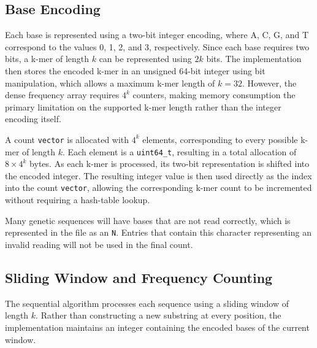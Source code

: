 \documentclass{article}
\begin{document}
\vspace{\baselineskip}

\subsection{Base Encoding}

\vspace{\baselineskip}

Each base is represented using a two-bit integer encoding, where A, C, G, and T correspond to the values
0, 1, 2, and 3, respectively. Since each base requires two bits, a k-mer of length $k$ can be represented
using $2k$ bits. The implementation then stores the encoded k-mer in an unsigned 64-bit integer using bit manipulation, 
which allows a maximum k-mer length of $k=32$. However, the dense frequency array requires $4^k$ counters, making memory 
consumption the primary limitation on the supported k-mer length rather than the integer encoding itself.

\vspace{\baselineskip}

A count \texttt{vector} is allocated with $4^k$ elements, corresponding to every possible k-mer of length $k$.
Each element is a \texttt{uint64\_t}, resulting in a total allocation of $8 \times 4^k$ bytes. As each
k-mer is processed, its two-bit representation is shifted into the encoded integer. The resulting integer
value is then used directly as the index into the count \texttt{vector}, allowing the corresponding k-mer count
to be incremented without requiring a hash-table lookup.

\vspace{\baselineskip}

Many genetic sequences will have bases that are not read correctly, which is represented in the file as an \texttt{N}. 
Entries that contain this character representing an invalid reading will not be used in the final count.

\subsection{Sliding Window and Frequency Counting}

The sequential algorithm processes each sequence using a sliding window of length $k$. Rather than
constructing a new substring at every position, the implementation maintains an integer containing the
encoded bases of the current window.

\vspace{\baselineskip}
\end{document}
